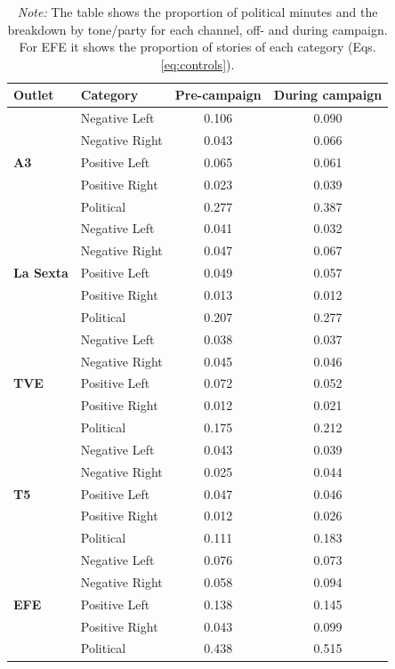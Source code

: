 \documentclass[12pt]{article}
\begin{document}
	\begin{table}[!htbp]
		\centering
		\caption{Proportion of Political Content and Sentiment by Channel}
		\begin{tabular}{llcc}
			\toprule
			\textbf{Outlet} & \textbf{Category} & \textbf{Pre-campaign} & \textbf{During campaign} \\
			\midrule
			\midrule
			\multirow{5}{*}{\textbf{A3}}& Negative Left & 0.106 & 0.090 \\
			& Negative Right & 0.043 & 0.066 \\
			& Positive Left & 0.065 & 0.061 \\
			& Positive Right & 0.023 & 0.039 \\
			& Political & 0.277 & 0.387 \\
			\midrule
			\multirow{5}{*}{\textbf{La Sexta}}& Negative Left & 0.041 & 0.032 \\
			& Negative Right & 0.047 & 0.067 \\
			& Positive Left & 0.049 & 0.057 \\
			& Positive Right & 0.013 & 0.012 \\
			& Political & 0.207 & 0.277 \\
			\midrule
			\multirow{5}{*}{\textbf{TVE}}& Negative Left & 0.038 & 0.037 \\
			& Negative Right & 0.045 & 0.046 \\
			& Positive Left & 0.072 & 0.052 \\
			& Positive Right & 0.012 & 0.021 \\
			& Political & 0.175 & 0.212 \\
			\midrule
			\multirow{5}{*}{\textbf{T5}}& Negative Left & 0.043 & 0.039 \\
			& Negative Right & 0.025 & 0.044 \\
			& Positive Left & 0.047 & 0.046 \\
			& Positive Right & 0.012 & 0.026 \\
			& Political & 0.111 & 0.183 \\
			\bottomrule
				\multirow{5}{*}{\textbf{ EFE}} & Negative Left & 0.076 & 0.073 \\
			& Negative Right & 0.058 & 0.094\\
			& Positive Left & 0.138 & 0.145 \\
			& Positive Right & 0.043 & 0.099\\
			& Political & 0.438 & 0.515 \\
			\bottomrule
			
		\end{tabular}
		\caption*{\small \textit{Note:} The table shows the proportion of political minutes and the breakdown by tone/party for each channel, off- and during campaign. For EFE it shows the proportion of stories of each category (Eqs. \eqref{eq:controls}). }
		\label{tab:political_sentiment_types}
	\end{table}
	
\end{document}
